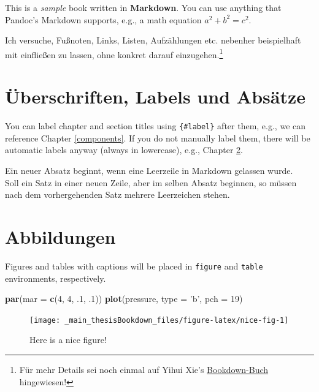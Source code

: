 \documentclass[]{book}
\makeatletter
\newenvironment{Shaded}{\begin{snugshade}}{\end{snugshade}}
\newcommand{\KeywordTok}[1]{\textcolor[rgb]{0.13,0.29,0.53}{\textbf{{#1}}}}
\newcommand{\DataTypeTok}[1]{\textcolor[rgb]{0.13,0.29,0.53}{{#1}}}
\newcommand{\DecValTok}[1]{\textcolor[rgb]{0.00,0.00,0.81}{{#1}}}
\newcommand{\StringTok}[1]{\textcolor[rgb]{0.31,0.60,0.02}{{#1}}}
\newcommand{\NormalTok}[1]{{#1}}
\let\rmarkdownfootnote\footnote%
\def\footnote{\protect\rmarkdownfootnote}
\newenvironment{kframe}{%
\medskip{}
\setlength{\fboxsep}{.8em}
 \def\at@end@of@kframe{}%
 \ifinner\ifhmode%
  \def\at@end@of@kframe{\end{minipage}}%
  \begin{minipage}{\columnwidth}%
 \fi\fi%
 \def\FrameCommand##1{\hskip\@totalleftmargin \hskip-\fboxsep
 \colorbox{shadecolor}{##1}\hskip-\fboxsep
     \hskip-\linewidth \hskip-\@totalleftmargin \hskip\columnwidth}%
 \MakeFramed {\advance\hsize-\width
   \@totalleftmargin\z@ \linewidth\hsize
   \@setminipage}}%
 {\par\unskip\endMakeFramed%
 \at@end@of@kframe}
\renewenvironment{Shaded}{\begin{kframe}}{\end{kframe}}
\theoremstyle{definition}
\theoremstyle{definition}
\theoremstyle{remark}
\makeatother
\begin{document}
This is a \emph{sample} book written in \textbf{Markdown}. You can use
anything that Pandoc's Markdown supports, e.g., a math equation
\(a^2 + b^2 = c^2\).

Ich versuche, Fußnoten, Links, Listen, Aufzählungen etc. nebenher
beispielhaft mit einfließen zu lassen, ohne konkret darauf
einzugehen.\footnote{Für mehr Details sei noch einmal auf Yihui Xie's
  \href{https://bookdown.org/yihui/bookdown/components.html}{Bookdown-Buch}
  hingewiesen!}

\section{Überschriften, Labels und
Absätze}\label{uberschriften-labels-und-absatze}

You can label chapter and section titles using \texttt{\{\#label\}}
after them, e.g., we can reference Chapter \ref{components}. If you do
not manually label them, there will be automatic labels anyway (always
in lowercase), e.g., Chapter \ref{abbildungen}.

Ein neuer Absatz beginnt, wenn eine Leerzeile in Markdown gelassen
wurde.\\
Soll ein Satz in einer neuen Zeile, aber im selben Absatz beginnen, so
müssen nach dem vorhergehenden Satz mehrere Leerzeichen stehen.

\section{Abbildungen}\label{abbildungen}

Figures and tables with captions will be placed in \texttt{figure} and
\texttt{table} environments, respectively.

\begin{Shaded}
\begin{Highlighting}[]
\KeywordTok{par}\NormalTok{(}\DataTypeTok{mar =} \KeywordTok{c}\NormalTok{(}\DecValTok{4}\NormalTok{, }\DecValTok{4}\NormalTok{, .}\DecValTok{1}\NormalTok{, .}\DecValTok{1}\NormalTok{))}
\KeywordTok{plot}\NormalTok{(pressure, }\DataTypeTok{type =} \StringTok{'b'}\NormalTok{, }\DataTypeTok{pch =} \DecValTok{19}\NormalTok{)}
\end{Highlighting}
\end{Shaded}

\begin{figure}

{\centering \texttt{[image: \_main\_thesisBookdown\_files/figure-latex/nice-fig-1]} 

}

\caption{Here is a nice figure!}\label{fig:nice-fig}
\end{figure}
\end{document}
